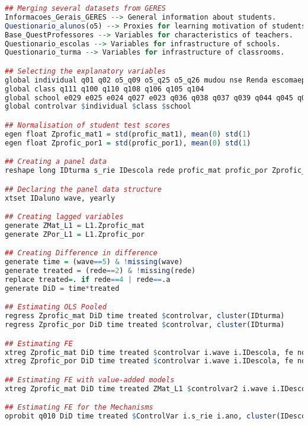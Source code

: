 \documentclass[a4paper, 12pt]{article}
\begin{document}
\begin{lstlisting}[language=R]
## Merging several datasets from GERES
Informacoes_Gerais_GERES --> General information about students.
Questionario_alunos(o5) --> Proxies for learning motivation of students.
Base_QuestProfessores --> Variables for characteristics of teachers. 
Questionario_escolas --> Variables for infrastructure of schools.
Questionario_turma --> Variables for infrastructure of classrooms.

## Selecting the explanatory variables
global individual q01 q02 o5_q09 o5_q25 o5_q26 mudou nse Renda escomaep escopaip
global class q111 q100 q110 q108 q106 q105 q104
global school e029 e025 e024 q027 e023 q036 q038 q037 q039 q044 q045 q046
global controlvar $individual $class $school

## Normalisation of student test scores
egen float Zprofic_mat1 = std(profic_mat1), mean(0) std(1)
egen float Zprofic_por1 = std(profic_por1), mean(0) std(1)

## Creating a panel data
reshape long IDturma s_rie IDescola rede profic_mat profic_por Zprofic_mat Zprofic_por cad_mat cad_por Onda Inf, i(IDaluno) j(wave)

## Declaring the panel data structure 
xtset IDaluno wave, yearly

## Creating lagged variables
generate ZMat_L1 = L1.Zprofic_mat
generate ZPor_L1 = L1.Zprofic_por

## Creating Difference in difference
generate time = (wave==5) & !missing(wave) 
generate treated = (rede==2) & !missing(rede) 
replace treated=. if rede==4 | rede==.a
generate DiD = time*treated 

## Estimating OLS Pooled
regress Zprofic_mat DiD time treated $controlvar, cluster(IDturma)
regress Zprofic_por DiD time treated $controlvar, cluster(IDturma)

## Estimating FE
xtreg Zprofic_mat DiD time treated $controlvar i.wave i.IDescola, fe nonest cluster(IDturma)
xtreg Zprofic_por DiD time treated $controlvar i.wave i.IDescola, fe nonest cluster(IDturma)

## Estimating FE with value-added models
xtreg Zprofic_mat DiD time treated ZMat_L1 $controlvar2 i.wave i.IDescola, fe nonest cluster(IDturma)

## Estimating FE for the Mechanisms
oprobit q010 DiD time treated $ControlVar i.s_rie i.ano, cluster(IDescola)



 



\end{lstlisting}
\end{document}
